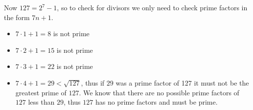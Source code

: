 \documentclass{article}
\begin{document}
	Now $127=2^7-1$, so to check for divisors we only need to check prime factors in the form $7n+1$.
	
	\begin{itemize}
		\item $7\cdot1+1 = 8$ is not prime
		\item $7\cdot2+1 = 15$ is not prime
		\item $7\cdot3+1 = 22$ is not prime
		\item $7\cdot4+1 = 29 < \sqrt{127}$, thus if $29$ was a prime factor of 127 it must not be the greatest prime of $127$. We know that there are no possible prime factors of $127$ less than $29$, thus $127$ has no prime factors and must be prime.
	\end{itemize}
\end{document}
